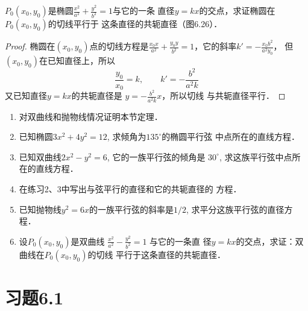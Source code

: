 \begin{example}
    $P_0(x_0,y_0)$是椭圆$\frac{x^2}{a^2}+\frac{y^2}{b^2}=1$与它的一条
直径$y=kx$的交点，求证椭圆在$P_0(x_0,y_0)$的切线平行于
这条直径的共轭直径（图6.26）．
\end{example}

\begin{proof}
    椭圆在$(x_0,y_0)$点的切线方程是$\frac{x_0x}{a^2}+\frac{y_0y}{b^2}=1$，它的斜率$k'=-\frac{x_0b^2}{a^2y_0}$，
    但$(x_0,y_0)$在已知直径上，所以
\[\frac{y_0}{x_0}=k,\qquad k'=-\frac{b^2}{a^2k}\]
又已知直径$y=kx$的共轭直径是
$y=-\frac{b^2}{a^2k}x$，所以切线
与共轭直径平行．
\end{proof}


\begin{ex}
\begin{enumerate}
    \item 对双曲线和抛物线情况证明本节定理．
    \item 已知椭圆$3x^2+4y^2=12$, 求倾角为$135^{\circ}$的椭圆平行弦
    中点所在的直线方程．
    \item 已知双曲线$2x^2-y^2=6$, 它的一族平行弦的倾角是
    $30^{\circ}$, 求这族平行弦中点所在的直线方程．
    \item 在练习2、3中写出与弦平行的直径和它的共轭直径的
    方程．
    \item 已知抛物线$y^2=6x$的一族平行弦的斜率是$1/2$, 
    求平分这族平行弦的直径方程．
    \item 设$P_0(x_0,y_0)$是双曲线
    $\frac{x^2}{a^2}-\frac{y^2}{b^2}=1$
    与它的一条直
    径$y=kx$的交点，求证：双曲线在$P_0(x_0,y_0)$的切线
    平行于这条直径的共轭直径．
\end{enumerate}
\end{ex}

\section*{习题6.1}


